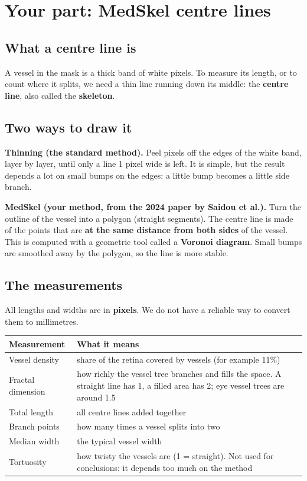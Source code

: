 \documentclass[11pt,a4paper]{article}
\begin{document}
\section{Your part: MedSkel centre lines}

\subsection{What a centre line is}
A vessel in the mask is a thick band of white pixels. To measure its length, or to count where it splits, we need a thin line running down its middle: the \textbf{centre line}, also called the \textbf{skeleton}.

\subsection{Two ways to draw it}
\textbf{Thinning (the standard method).} Peel pixels off the edges of the white band, layer by layer, until only a line 1 pixel wide is left. It is simple, but the result depends a lot on small bumps on the edges: a little bump becomes a little side branch.

\textbf{MedSkel (your method, from the 2024 paper by Saidou et al.).} Turn the outline of the vessel into a polygon (straight segments). The centre line is made of the points that are \textbf{at the same distance from both sides} of the vessel. This is computed with a geometric tool called a \textbf{Voronoi diagram}. Small bumps are smoothed away by the polygon, so the line is more stable.

\subsection{The measurements}
All lengths and widths are in \textbf{pixels}. We do not have a reliable way to convert them to millimetres.
\begin{center}
\begin{tabular}{@{}p{3.6cm}p{11cm}@{}}
\toprule
\textbf{Measurement} & \textbf{What it means} \\
\midrule
Vessel density & share of the retina covered by vessels (for example 11\%) \\
Fractal dimension & how richly the vessel tree branches and fills the space. A straight line has 1, a filled area has 2; eye vessel trees are around 1.5 \\
Total length & all centre lines added together \\
Branch points & how many times a vessel splits into two \\
Median width & the typical vessel width \\
Tortuosity & how twisty the vessels are (1 = straight). Not used for conclusions: it depends too much on the method \\
\bottomrule
\end{tabular}
\end{center}
\end{document}
